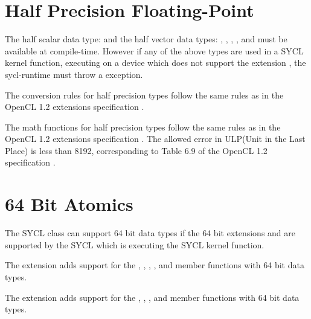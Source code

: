 \section{Half Precision Floating-Point}
\label{sec:extension-fp16}

The half scalar data type:  and the half vector data types: , , , ,  and  must be available at compile-time. However if any of the above types are used in a SYCL kernel function, executing on a device which does not support the extension , the \gls{sycl-runtime} must throw a  exception.

The conversion rules for half precision types follow the same rules as in the OpenCL 1.2 extensions specification \cite[par. 9.5.1]{openclext12}.

The math functions for half precision types follow the same rules as in the OpenCL 1.2 extensions specification \cite[par. 9.5.2, 9.5.3, 9.5.4, 9.5.5]{openclext12}. The allowed error in ULP(Unit in the Last Place) is less than  8192, corresponding to Table 6.9 of the OpenCL 1.2 specification \cite{opencl12}.

\section{64 Bit Atomics}
\label{sec:extension.64bit-atomics}

The SYCL  class can support 64 bit data types if the 64 bit
extensions  and  are supported by the SYCL 
which is executing the SYCL kernel function.

The extension  adds support for the
, , ,
,  and
 member functions with 64 bit data types.

The extension  adds support for the
, , ,
 and  member functions with 64 bit
data types.


